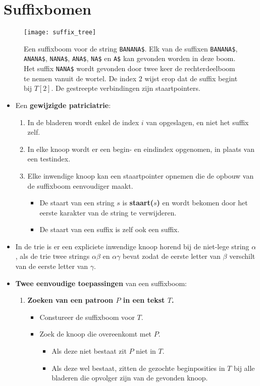 \section{Suffixbomen}
\begin{figure}[ht]
    \centering
    \texttt{[image: suffix\_tree]}
    \caption{Een suffixboom voor de string \texttt{BANANA\$}. Elk van de suffixen \texttt{BANANA\$}, \texttt{ANANA\$}, \texttt{NANA\$}, \texttt{ANA\$}, \texttt{NA\$} en \texttt{A\$} kan gevonden worden in deze boom. Het suffix \texttt{NANA\$} wordt gevonden door twee keer de rechterdeelboom te nemen vanuit de wortel. De index $2$ wijst erop dat de suffix begint bij $T[2]$. De gestreepte verbindingen zijn staartpointers.}
    \label{fig:suffix_tree}
\end{figure}
\begin{itemize}
    \item Een \textbf{gewijzigde patriciatrie}:
    \begin{enumerate}
        \item In de bladeren wordt enkel de index $i$ van  opgeslagen, en niet het suffix zelf.
        \item In elke knoop wordt er een begin- en eindindex opgenomen, in plaats van een testindex.
        \item Elke inwendige knoop kan een staartpointer opnemen die de opbouw van de suffixboom eenvoudiger maakt.
        \begin{itemize}
            \item De staart van een string $s$ is \textbf{staart($s$)} en wordt bekomen door het eerste karakter van de string te verwijderen.
            \item De staart van een suffix is zelf ook een suffix.
        \end{itemize}
    \end{enumerate}
    \item In de trie is er een expliciete inwendige knoop horend bij de niet-lege string $\alpha$, als de trie twee strings $\alpha\beta$ en $\alpha\gamma$ bevat zodat de eerste letter van $\beta$ verschilt van de eerste letter van $\gamma$.

    \item \textbf{Twee eenvoudige toepassingen} van een suffixboom:
    \begin{enumerate}
        \item \textbf{Zoeken van een patroon $P$ in een tekst $T$.}
        \begin{itemize}
            \item Constureer de suffixboom voor $T$.
            \item Zoek de knoop die overeenkomt met $P$.
            \begin{itemize}
                \item Als deze niet bestaat zit $P$ niet in $T$.
                \item Als deze wel bestaat, zitten de gezochte beginposities in $T$ bij alle bladeren die opvolger zijn van de gevonden knoop.
            \end{itemize}
        \end{itemize}


\end{enumerate}
\end{itemize}
